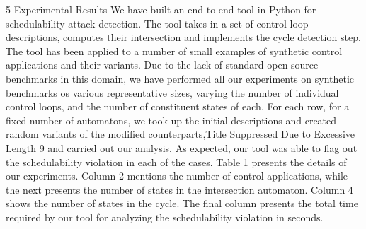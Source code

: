 \begin{frame}
5
Experimental Results
We have built an end-to-end tool in Python for schedulability attack detection.
The tool takes in a set of control loop descriptions, computes their intersection
and implements the cycle detection step. The tool has been applied to a number
of small examples of synthetic control applications and their variants. Due to
the lack of standard open source benchmarks in this domain, we have performed
all our experiments on synthetic benchmarks os various representative sizes,
varying the number of individual control loops, and the number of constituent
states of each. For each row, for a fixed number of automatons, we took up the
initial descriptions and created random variants of the modified counterparts,Title Suppressed Due to Excessive Length
9
and carried out our analysis. As expected, our tool was able to flag out the
schedulability violation in each of the cases. Table 1 presents the details of our
experiments. Column 2 mentions the number of control applications, while the
next presents the number of states in the intersection automaton. Column 4
shows the number of states in the cycle. The final column presents the total
time required by our tool for analyzing the schedulability violation in seconds.
 
\end{frame}
